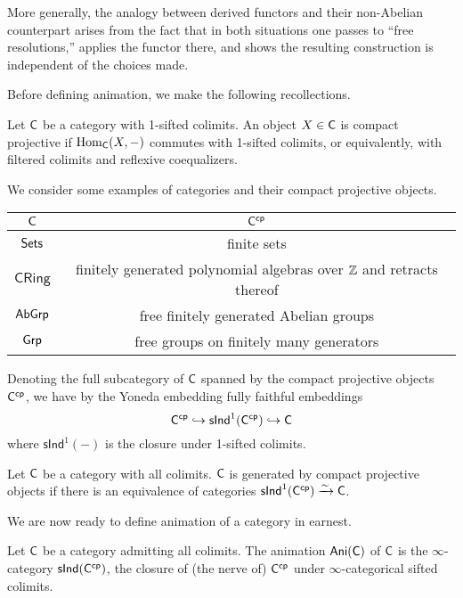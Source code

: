 More generally, the analogy between derived functors and their non-Abelian counterpart arises from the fact that in both situations one passes to ``free resolutions,'' applies the functor there, and shows the resulting construction is independent of the choices made. 

Before defining animation, we make the following recollections. 
\begin{definition}\label{def: compact projective objects}
    Let $\mathsf{C}$ be a category with 1-sifted colimits. An object $X\in\mathsf{C}$ is compact projective if $\mathrm{Hom}_{\mathsf{C}}(X,-)$ commutes with 1-sifted colimits, or equivalently, with filtered colimits and reflexive coequalizers. 
\end{definition}
\begin{example}\label{ex: compact projectives}
    We consider some examples of categories and their compact projective objects. 
    {\begin{center}
        \begin{tabular}{| c | c |}
        \hline 
        $\mathsf{C}$ & $\mathsf{C}^{\mathsf{cp}}$ \\\hline
        $\mathsf{Sets}$ & finite sets \\\hline
        $\mathsf{CRing}$ & finitely generated polynomial algebras over $\mathbb{Z}$ and retracts thereof \\\hline
        $\mathsf{AbGrp}$ & free finitely generated Abelian groups \\\hline
        $\mathsf{Grp}$ & free groups on finitely many generators\\\hline
    \end{tabular}
    \end{center}}
\end{example}
Denoting the full subcategory of $\mathsf{C}$ spanned by the compact projective objects $\mathsf{C}^{\mathsf{cp}}$, we have by the Yoneda embedding fully faithful embeddings 
$$\mathsf{C}^{\mathsf{cp}}\hookrightarrow\mathsf{sInd}^{1}(\mathsf{C}^{\mathsf{cp}})\hookrightarrow\mathsf{C}$$
where $\mathsf{sInd}^{1}(-)$ is the closure under 1-sifted colimits. 
\begin{definition}\label{def: CPG category}
    Let $\mathsf{C}$ be a category with all colimits. $\mathsf{C}$ is generated by compact projective objects if there is an equivalence of categories $\mathsf{sInd}^{1}(\mathsf{C}^{\mathsf{cp}})\xrightarrow{\sim}\mathsf{C}$. 
\end{definition}
We are now ready to define animation of a category in earnest. 
\begin{definition}\label{def: animation of a category}
    Let $\mathsf{C}$ be a category admitting all colimits. The animation $\mathsf{Ani}(\mathsf{C})$ of $\mathsf{C}$ is the $\infty$-category $\mathsf{sInd}(\mathsf{C}^{\mathsf{cp}})$, the closure of (the nerve of) $\mathsf{C}^{\mathsf{cp}}$ under $\infty$-categorical sifted colimits. 
\end{definition}
